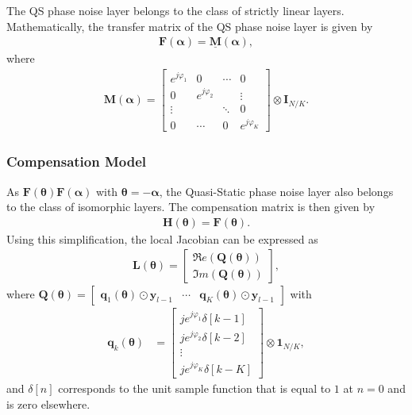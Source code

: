 \documentclass{article}
\begin{document}
The QS phase noise layer belongs to the class of strictly linear layers. Mathematically, the transfer matrix of the QS phase noise layer is given by 
\begin{align*}
\mathbf{F}(\boldsymbol \alpha)=\underline{\mathbf{M}}(\boldsymbol \alpha),
\end{align*}
where 
\begin{align}
\mathbf{M}(\boldsymbol \alpha)= 
\begin{bmatrix}
e^{j \varphi_1} & 0 &\cdots & 0 \\
0 & e^{j \varphi_2}&  &\vdots\\
\vdots & & \ddots& 0\\
0&\cdots&0&e^{j \varphi_K}
\end{bmatrix}\otimes \mathbf{I}_{N/K}.
\end{align}

\subsubsection{Compensation Model}
As $\mathbf{F}(\boldsymbol  \theta)\mathbf{F}(\boldsymbol  \alpha)$ with $\boldsymbol \theta=-\boldsymbol \alpha$, the Quasi-Static phase noise layer also belongs to the class of isomorphic layers. The compensation matrix is then given by
\begin{align}
\mathbf{H}(\boldsymbol \theta)=\mathbf{F}(\boldsymbol \theta).
\end{align}
Using this simplification, the local Jacobian can be expressed as
\begin{align*}
\mathbf{L}(\boldsymbol \theta) = \begin{bmatrix}
\Re e(\mathbf{Q}(\boldsymbol \theta))\\
\Im m(\mathbf{Q}(\boldsymbol \theta))
\end{bmatrix},
\end{align*}
where $\mathbf{Q}(\boldsymbol \theta)=
\begin{bmatrix}
\mathbf{q}_1(\boldsymbol \theta)\odot \mathbf{y}_{l-1} & \cdots & \mathbf{q}_K(\boldsymbol \theta)\odot \mathbf{y}_{l-1}
\end{bmatrix}$ with
\begin{align}
\mathbf{q}_k(\boldsymbol \theta)
&= \begin{bmatrix}
je^{j \varphi_1}\delta[k-1]\\
je^{j \varphi_2}\delta[k-2]\\
\vdots \\
je^{j \varphi_K}\delta[k-K]
\end{bmatrix}\otimes \mathbf{1}_{N/K},\end{align}
and $\delta[n]$ corresponds to the unit sample function that is equal to $1$ at $n=0$ and is zero elsewhere.
\end{document}

